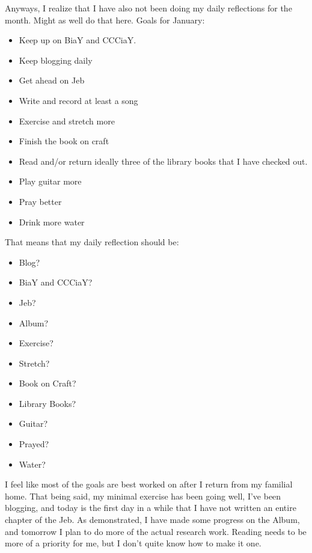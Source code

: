 \documentclass[12pt]{article}[titlepage]
\renewcommand{\,}{\textsuperscript{,}}
\begin{document}
Anyways, I realize that I have also not been doing my daily reflections for the month.
Might as well do that here.\endnotemark[8]
Goals for January:
\begin{itemize}
\item Keep up on BiaY and CCCiaY.
\item Keep blogging daily
\item Get ahead on Jeb
\item Write and record at least a song
\item Exercise and stretch more
\item Finish the book on craft
\item Read and/or return ideally three of the library books that I have checked out.
\item Play guitar more
\item Pray better
\item Drink more water
\end{itemize}
That means that my daily reflection should be:
\begin{itemize}
\item Blog?
\item BiaY and CCCiaY?
\item Jeb?
\item Album?
\item Exercise?
\item Stretch?
\item Book on Craft?
\item Library Books?
\item Guitar?
\item Prayed?
\item Water?
\end{itemize}

I feel like most of the goals are best worked on after I return from my familial home.
That being said, my minimal exercise has been going well, I've been blogging, and today is the first day in a while that I have not written an entire chapter of the Jeb.
As demonstrated, I have made some progress on the Album\endnotemark[9], and tomorrow I plan to do more of the actual research work.
Reading needs to be more of a priority for me, but I don't quite know how to make it one.

\endnotes
\end{document}
